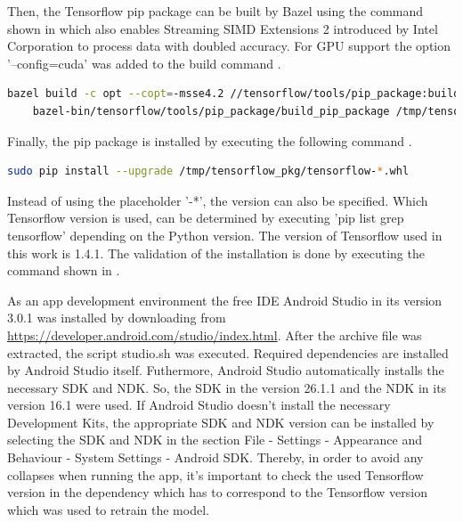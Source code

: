 Then, the Tensorflow pip package can be built by Bazel using the command shown in  which also enables Streaming SIMD Extensions 2 introduced by Intel Corporation to process data with doubled accuracy. For GPU support the option '--config=cuda' was added to the build command \citep{GithubBazel}.

\begin{minipage}{\linewidth}
\begin{lstlisting}[caption=Building the Tensorflow pip package, label=list:pip_package, language=bash]
	bazel build -c opt --copt=-msse4.2 //tensorflow/tools/pip_package:build_pip_package
	bazel-bin/tensorflow/tools/pip_package/build_pip_package /tmp/tensorflow_pkg
\end{lstlisting}
\end{minipage}

Finally, the pip package is installed by executing the following command .

\begin{minipage}{\linewidth}
\begin{lstlisting}[caption=Installing the pip package, label=list:pip_install, language=bash]
	sudo pip install --upgrade /tmp/tensorflow_pkg/tensorflow-*.whl
\end{lstlisting}
\end{minipage}

Instead of using the placeholder '-*', the version can also be specified. Which Tensorflow version is used, can be determined by executing 'pip list \big \vert grep tensorflow' depending on the Python version. The version of Tensorflow used in this work is 1.4.1. The validation of the installation is done by executing the command shown in  \citep{TensorflowBazel}.

As an app development environment the free IDE Android Studio in its version 3.0.1 was installed by downloading from \url{https://developer.android.com/studio/index.html}. After the archive file was extracted, the script studio.sh was executed. Required dependencies are installed by Android Studio itself. Futhermore, Android Studio automatically installs the necessary SDK and NDK. So, the SDK in the version 26.1.1 and the NDK in its version 16.1 were used. If Android Studio doesn't install the necessary Development Kits, the appropriate SDK and NDK version can be installed by selecting the SDK and NDK in the section File - Settings - Appearance and Behaviour - System Settings - Android SDK. Thereby, in order to avoid any collapses when running the app, it's important to check the used Tensorflow version in the dependency which has to correspond to the Tensorflow version which was used to retrain the model.\\

